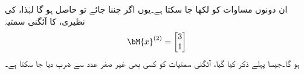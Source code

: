 ان دونوں مساوات کو  لکھا جا سکتا ہے۔یوں اگر  چننا جائے تو  حاصل ہو گا لہٰذا،  کی نظیری،  کا آئگنی سمتیہ 
\begin{align*}
\bM{x}^{(2)}=
\begin{bmatrix}
3\\
1
\end{bmatrix}
\end{align*}
ہو گا۔جیسا پہلے ذکر کیا گیا، آئگنی سمتیات کو کسی  بھی غیر صفر عدد سے ضرب دیا جا سکتا ہے۔

